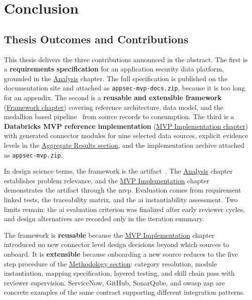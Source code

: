 \chapter*{Conclusion}

\section*{Thesis Outcomes and Contributions}

This thesis delivers the three contributions announced in the abstract. The first is a \textbf{requirements specification} for an application security data platform, grounded in the \hyperref[ch:analysis]{Analysis} chapter. The full specification is published on the documentation site and attached as \texttt{appsec-mvp-docs.zip}, because it is too long for an appendix. The second is a \textbf{reusable and extensible framework} (\hyperref[ch:framework]{Framework chapter}) covering reference architecture, data model, and the medallion based pipeline~\parencite{Strengholt2025} from source records to consumption. The third is a \textbf{Databricks MVP reference implementation} (\hyperref[ch:implementation]{MVP Implementation chapter}) with generated connector modules for nine selected data sources, explicit evidence levels in the \hyperref[sec:impl-results]{Aggregate Results section}, and the implementation archive attached as \texttt{appsec-mvp.zip}.

In design science terms, the framework is the artifact~\parencite{Hevner2004, Peffers2007}. The \hyperref[ch:analysis]{Analysis} chapter establishes problem relevance, and the \hyperref[ch:implementation]{MVP Implementation} chapter demonstrates the artifact through the \gls{mvp}. Evaluation comes from requirement linked tests, the traceability matrix, and the \gls{ai} instantiability assessment. Two limits remain: the \gls{ai} evaluation criterion was finalized after early reviewer cycles, and design alternatives are recorded only in the iteration summary.

The framework is \textbf{reusable} because the \hyperref[ch:implementation]{MVP Implementation} chapter introduced no new connector level design decisions beyond which sources to onboard. It is \textbf{extensible} because onboarding a new source reduces to the five step procedure of the \hyperref[sec:impl-methodology]{Methodology section}: category resolution, module instantiation, mapping specification, layered testing, and skill chain pass with reviewer supervision. ServiceNow, GitHub, SonarQube, and \gls{owasp} \gls{zap} are concrete examples of the same contract supporting different integration patterns.

